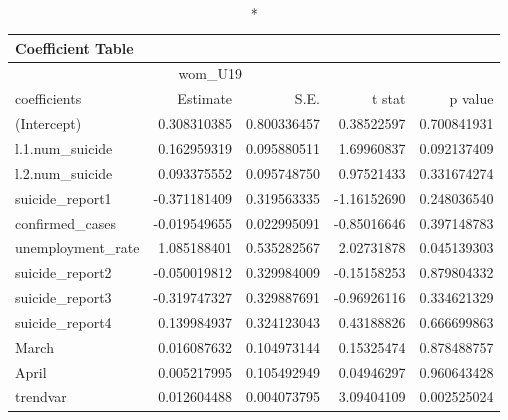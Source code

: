 \begin{longtable}{lrrrr}
\caption*{
{\large Coefficient Table}
} \\ 
\toprule
\multicolumn{4}{c}{wom\_U19} &  \\ 
\cmidrule(lr){1-4}
coefficients & Estimate & S.E. & t stat & p value \\ 
\midrule\addlinespace[2.5pt]
(Intercept) & 0.308310385 & 0.800336457 & 0.38522597 & 0.700841931 \\ 
l.1.num\_suicide & 0.162959319 & 0.095880511 & 1.69960837 & 0.092137409 \\ 
l.2.num\_suicide & 0.093375552 & 0.095748750 & 0.97521433 & 0.331674274 \\ 
suicide\_report1 & -0.371181409 & 0.319563335 & -1.16152690 & 0.248036540 \\ 
confirmed\_cases & -0.019549655 & 0.022995091 & -0.85016646 & 0.397148783 \\ 
unemployment\_rate & 1.085188401 & 0.535282567 & 2.02731878 & 0.045139303 \\ 
suicide\_report2 & -0.050019812 & 0.329984009 & -0.15158253 & 0.879804332 \\ 
suicide\_report3 & -0.319747327 & 0.329887691 & -0.96926116 & 0.334621329 \\ 
suicide\_report4 & 0.139984937 & 0.324123043 & 0.43188826 & 0.666699863 \\ 
March & 0.016087632 & 0.104973144 & 0.15325474 & 0.878488757 \\ 
April & 0.005217995 & 0.105492949 & 0.04946297 & 0.960643428 \\ 
trendvar & 0.012604488 & 0.004073795 & 3.09404109 & 0.002525024 \\ 
\bottomrule
\end{longtable}

